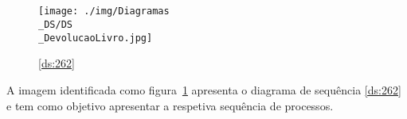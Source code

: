 \subsection{}

\begin{figure}[H]
	\centering
	\texttt{[image: ./img/Diagramas\\\_DS/DS\\\_DevolucaoLivro.jpg]}  %
	\caption{\ref{ds:262}}
	\label{fig:chap262}
\end{figure}

\par A imagem identificada como figura~\ref{fig:chap262} apresenta o diagrama de sequência \ref{ds:262} e tem como objetivo apresentar a respetiva sequência de processos.